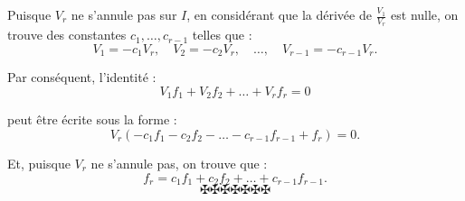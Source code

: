 Puisque $V_r$ ne s'annule pas sur $I$, en consid{\'e}rant que la
d{\'e}riv{\'e}e de $\frac{V_1}{V_r}$ est nulle, on trouve des constantes $c_1,
\ldots, c_{r - 1}$ telles que :
\[ V_1 = - c_1 V_r, \quad V_2 = - c_2 V_r, \quad \ldots, \quad V_{r - 1} = -
   c_{r - 1} V_r . \]


Par cons{\'e}quent, l'identit{\'e} :
\[ V_1 f_1 + V_2 f_2 + \ldots + V_r f_r = 0 \]


peut {\^e}tre {\'e}crite sous la forme :
\[ V_r (- c_1 f_1 - c_2 f_2 - \ldots - c_{r - 1} f_{r - 1} + f_r) = 0. \]


Et, puisque $V_r$ ne s'annule pas, on trouve que :
\[ f_r = c_1 f_1 + c_2 f_2 + \ldots + c_{r - 1} f_{r - 1} . \]
\[ \maltese \maltese \maltese \maltese \maltese \maltese \maltese \]
